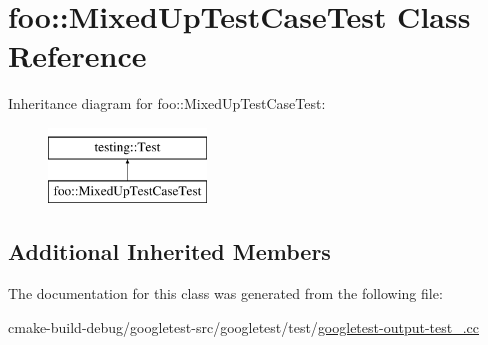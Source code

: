 \hypertarget{classfoo_1_1MixedUpTestCaseTest}{}\section{foo\+::Mixed\+Up\+Test\+Case\+Test Class Reference}
\label{classfoo_1_1MixedUpTestCaseTest}
Inheritance diagram for foo\+::Mixed\+Up\+Test\+Case\+Test\+:\begin{figure}[H]
\begin{center}
\leavevmode
\includegraphics[height=2.000000cm]{classfoo_1_1MixedUpTestCaseTest}
\end{center}
\end{figure}
\subsection*{Additional Inherited Members}


The documentation for this class was generated from the following file\+:\begin{DoxyCompactItemize}
\item 
cmake-\/build-\/debug/googletest-\/src/googletest/test/\mbox{\hyperlink{googletest-output-test___8cc}{googletest-\/output-\/test\+\_\+.\+cc}}\end{DoxyCompactItemize}
